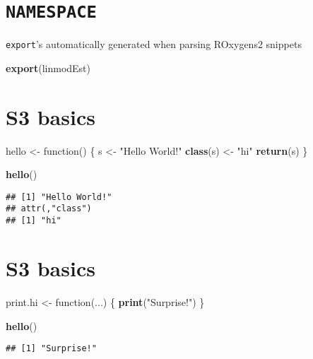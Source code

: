\documentclass[]{book}
\newenvironment{Shaded}{\begin{snugshade}}{\end{snugshade}}
\newcommand{\KeywordTok}[1]{\textcolor[rgb]{0.13,0.29,0.53}{\textbf{{#1}}}}
\newcommand{\StringTok}[1]{\textcolor[rgb]{0.31,0.60,0.02}{{#1}}}
\newcommand{\NormalTok}[1]{{#1}}
\theoremstyle{definition}
\theoremstyle{definition}
\theoremstyle{definition}
\theoremstyle{remark}
\begin{document}
\section{\texorpdfstring{\texttt{NAMESPACE}}{NAMESPACE}}\label{namespace}

\texttt{export}'s automatically generated when parsing ROxygens2
snippets

\begin{Shaded}
\begin{Highlighting}[]
\KeywordTok{export}\NormalTok{(linmodEst)}
\end{Highlighting}
\end{Shaded}

\section{S3 basics}\label{s3-basics}

\begin{Shaded}
\begin{Highlighting}[]
\NormalTok{hello <-}\StringTok{ }\NormalTok{function() \{}
 \NormalTok{s <-}\StringTok{ "Hello World!"}
 \KeywordTok{class}\NormalTok{(s) <-}\StringTok{ "hi"}
 \KeywordTok{return}\NormalTok{(s)}
\NormalTok{\}}

\KeywordTok{hello}\NormalTok{()}
\end{Highlighting}
\end{Shaded}

\begin{verbatim}
## [1] "Hello World!"
## attr(,"class")
## [1] "hi"
\end{verbatim}

\section{S3 basics}\label{s3-basics-1}

\begin{Shaded}
\begin{Highlighting}[]
\NormalTok{print.hi <-}\StringTok{ }\NormalTok{function(...) \{}
  \KeywordTok{print}\NormalTok{(}\StringTok{"Surprise!"}\NormalTok{)}
\NormalTok{\}}

\KeywordTok{hello}\NormalTok{()}
\end{Highlighting}
\end{Shaded}

\begin{verbatim}
## [1] "Surprise!"
\end{verbatim}
\end{document}
